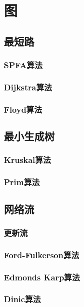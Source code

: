 
\section{图}
\subsection{最短路}
\subsubsection{SPFA算法}
\subsubsection{Dijkstra算法}
\subsubsection{Floyd算法}

\subsection{最小生成树}
\subsubsection{Kruskal算法}
\subsubsection{Prim算法}

\subsection{网络流}
\subsubsection{更新流}
\subsubsection{Ford-Fulkerson算法}
\subsubsection{Edmonds Karp算法}
\subsubsection{Dinic算法}
